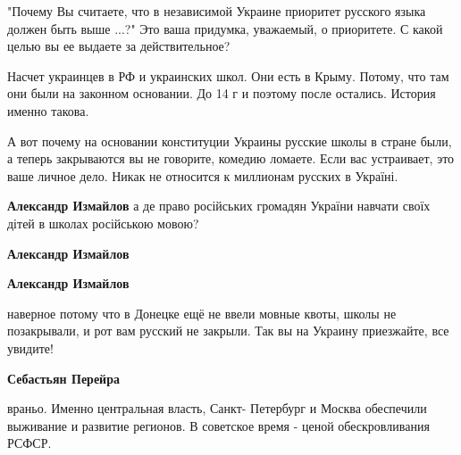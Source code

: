 \begin{itemize}
\begin{itemize}
"Почему Вы считаете, что в независимой Украине приоритет русского языка должен
быть выше ...?" Это ваша придумка, уважаемый, о приоритете. С какой целью вы ее
выдаете за действительное?

Насчет украинцев в РФ и украинских школ. Они есть в Крыму. Потому, что там они
были на законном основании. До 14 г и поэтому после остались. История именно
такова.

А вот почему на основании конституции Украины русские школы в стране были, а
теперь закрываются вы не говорите, комедию ломаете. Если вас устраивает, это
ваше личное дело. Никак не относится к миллионам русских в Україні.

 
\textbf{Александр Измайлов} а де право російських громадян України навчати своїх дітей в школах російською мовою?

 
\textbf{Александр Измайлов} 🤡

 
\textbf{Александр Измайлов} 

наверное потому что в Донецке ещё не ввели мовные квоты, школы не позакрывали,
и рот вам русский не закрыли. Так вы на Украину приезжайте, все увидите!


 
\textbf{Себастьян Перейра} 

враньо. Именно центральная власть, Санкт- Петербург и Москва обеспечили
выживание и развитие регионов. В советское время - ценой обескровливания РСФСР.

 

\end{itemize}
\end{itemize}
